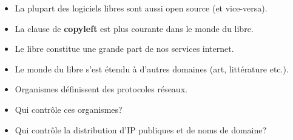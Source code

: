 \begin{slide}
	\begin{itemize}
		\item La plupart des logiciels libres sont aussi open source (et vice-versa).
		\item La clause de \textbf{copyleft} est plus courante dans le monde du libre.
		\item Le libre constitue une grande part de nos services internet.
		\item Le monde du libre s'est étendu à d'autres domaines (art, littérature etc.).
	\end{itemize}
\end{slide}

\begin{slide}
	\begin{itemize}
		\item Organismes définissent des protocoles réseaux.
		\item Qui contrôle ces organismes?
		\item Qui contrôle la distribution d'IP publiques et de noms de domaine?
	\end{itemize}
\end{slide}
